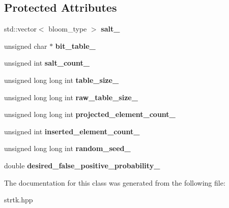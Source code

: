 \subsection*{Protected Attributes}
\begin{DoxyCompactItemize}
\item 
\hypertarget{classstrtk_1_1bloom_1_1filter_a4e56d8cfa2246773de801b76d844dfaa}{std\-::vector$<$ bloom\-\_\-type $>$ {\bfseries salt\-\_\-}}\label{classstrtk_1_1bloom_1_1filter_a4e56d8cfa2246773de801b76d844dfaa}

\item 
\hypertarget{classstrtk_1_1bloom_1_1filter_a7dc90f110481fb3b0f4f322f9ba13ee3}{unsigned char $\ast$ {\bfseries bit\-\_\-table\-\_\-}}\label{classstrtk_1_1bloom_1_1filter_a7dc90f110481fb3b0f4f322f9ba13ee3}

\item 
\hypertarget{classstrtk_1_1bloom_1_1filter_aca6a283ed1ee823590acb0a436d66992}{unsigned int {\bfseries salt\-\_\-count\-\_\-}}\label{classstrtk_1_1bloom_1_1filter_aca6a283ed1ee823590acb0a436d66992}

\item 
\hypertarget{classstrtk_1_1bloom_1_1filter_a246589ad0484a1f404cc0fbaf8af5b77}{unsigned long long int {\bfseries table\-\_\-size\-\_\-}}\label{classstrtk_1_1bloom_1_1filter_a246589ad0484a1f404cc0fbaf8af5b77}

\item 
\hypertarget{classstrtk_1_1bloom_1_1filter_a11aaab2270381c209f33f6b08b270774}{unsigned long long int {\bfseries raw\-\_\-table\-\_\-size\-\_\-}}\label{classstrtk_1_1bloom_1_1filter_a11aaab2270381c209f33f6b08b270774}

\item 
\hypertarget{classstrtk_1_1bloom_1_1filter_afda5f7534a7187b489d083255384088b}{unsigned long long int {\bfseries projected\-\_\-element\-\_\-count\-\_\-}}\label{classstrtk_1_1bloom_1_1filter_afda5f7534a7187b489d083255384088b}

\item 
\hypertarget{classstrtk_1_1bloom_1_1filter_a7b5c4600a831c4df9ebe02f34b112c99}{unsigned int {\bfseries inserted\-\_\-element\-\_\-count\-\_\-}}\label{classstrtk_1_1bloom_1_1filter_a7b5c4600a831c4df9ebe02f34b112c99}

\item 
\hypertarget{classstrtk_1_1bloom_1_1filter_aab43485401a79261931e8577e531bc62}{unsigned long long int {\bfseries random\-\_\-seed\-\_\-}}\label{classstrtk_1_1bloom_1_1filter_aab43485401a79261931e8577e531bc62}

\item 
\hypertarget{classstrtk_1_1bloom_1_1filter_aa6e22e400251d1f29427b1af89fcc82c}{double {\bfseries desired\-\_\-false\-\_\-positive\-\_\-probability\-\_\-}}\label{classstrtk_1_1bloom_1_1filter_aa6e22e400251d1f29427b1af89fcc82c}

\end{DoxyCompactItemize}


The documentation for this class was generated from the following file\-:\begin{DoxyCompactItemize}
\item 
strtk.\-hpp\end{DoxyCompactItemize}
